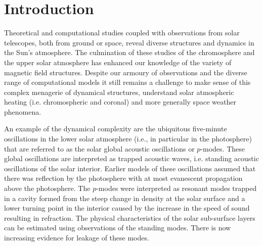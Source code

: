 \documentclass[physics,article,submit,pdftex,moreauthors]{Definitions/mdpi}
\begin{document}

\section{Introduction}

Theoretical and computational studies coupled with observations from solar telescopes,  both from ground or space, reveal diverse structures and dynamics in the Sun's atmosphere. The culmination of these studies of the  chromosphere and the upper solar atmosphere has enhanced our knowledge of the variety of magnetic field structures.  Despite our armoury of observations and the diverse range of computational models it still remains a challenge to make sense of this complex menagerie of dynamical structures, understand solar atmospheric heating (i.e. chromospheric and coronal) and more generally space weather phenomena.


An example of the dynamical complexity are the ubiquitous five-minute oscillations in the  lower solar atmosphere  (i.e., in particular in the photosphere) that are referred to as the solar global acoustic oscillations or $p$-modes. These global oscillations are interpreted as trapped acoustic waves, i.e. standing acoustic oscillations of the solar interior. Earlier models of these oscillations assumed that there was reflection by the photosphere with at most evanescent propagation above the photosphere. The $p$-modes were interpreted as resonant modes trapped in a cavity formed from the steep change in density at the solar surface and a lower turning point in the interior caused by the increase in the speed of sound resulting in refraction. The physical characteristics of the solar sub-surface layers can be estimated using observations of the standing modes.  There is now increasing evidence for leakage of these modes. %

   
\end{document}
